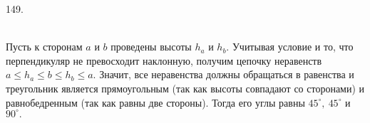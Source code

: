 149. \begin{figure}[ht!]
\end{figure}\\
Пусть к сторонам $a$ и $b$ проведены высоты $h_a$ и $h_b.$ Учитывая условие и то, что перпендикуляр не превосходит наклонную, получим цепочку неравенств $a\leqslant h_a\leqslant b \leqslant h_b \leqslant a.$ Значит, все неравенства должны обращаться в равенства и треугольник является прямоугольным (так как высоты совпадают со сторонами) и равнобедренным (так как равны две стороны). Тогда его углы равны $45^\circ,\ 45^\circ$ и $90^\circ.$\\
